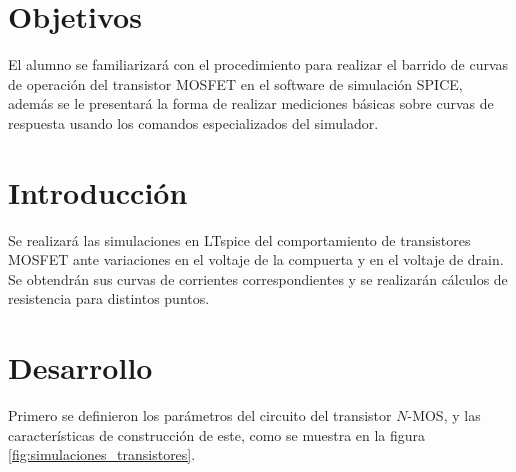 \documentclass[9pt,technote]{IEEEtran}
\begin{document}
	
	\maketitle
	
	\section*{Objetivos}
	El alumno se familiarizará con el procedimiento para realizar el barrido de curvas de operación del transistor MOSFET en el software de simulación SPICE, además se le presentará la forma de realizar mediciones básicas sobre curvas de respuesta usando los comandos especializados del simulador.


	\section*{Introducción}
	Se realizará las simulaciones en LTspice del comportamiento de transistores MOSFET ante variaciones en el voltaje de la compuerta y en el voltaje de drain. Se obtendrán sus curvas de corrientes correspondientes y se realizarán cálculos de resistencia para distintos puntos.
	
	\section*{Desarrollo}
	Primero se definieron los parámetros del circuito del transistor $N$-MOS, y las características de construcción de este, como se muestra en la figura \ref{fig:simulaciones_transistores}.
	
\end{document}
